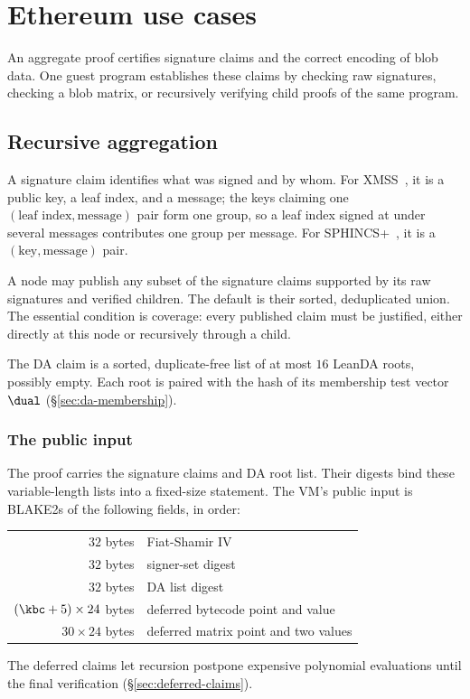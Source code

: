 \section{Ethereum use cases}\label{sec:ethereum}

An aggregate proof certifies signature claims and the correct encoding of blob data. One guest program establishes these claims by checking raw signatures, checking a blob matrix, or recursively verifying child proofs of the same program.

\subsection{Recursive aggregation}\label{sec:recursion}\label{sec:xmss-agg}\label{sec:sphincs-agg}

A signature claim identifies what was signed and by whom. For XMSS~\cite{rfc8391}, it is a public key, a leaf index, and a message; the keys claiming one $(\text{leaf index},\text{message})$ pair form one group, so a leaf index signed at under several messages contributes one group per message. For SPHINCS+~\cite{sphincs}, it is a $(\text{key},\text{message})$ pair.

A node may publish any subset of the signature claims supported by its raw signatures and verified children. The default is their sorted, deduplicated union. The essential condition is coverage: every published claim must be justified, either directly at this node or recursively through a child.

The DA claim is a sorted, duplicate-free list of at most $16$ LeanDA roots, possibly empty. Each root is paired with the hash of its membership test vector $\dual$ (\S\ref{sec:da-membership}). 

\subsubsection{The public input}\label{sec:rec-stmt}

The proof carries the signature claims and DA root list. Their digests bind these variable-length lists into a fixed-size statement. The VM's public input is BLAKE2s of the following fields, in order:
\begin{center}
\begin{tabular}{@{}rl@{}}
\hline
$32$ bytes & Fiat-Shamir IV\\
$32$ bytes & signer-set digest\\
$32$ bytes & DA list digest\\
$(\kbc+5)\times24$ bytes & deferred bytecode point and value\\
$30\times24$ bytes & deferred matrix point and two values\\
\hline
\end{tabular}
\end{center}
The deferred claims let recursion postpone expensive polynomial evaluations until the final verification (\S\ref{sec:deferred-claims}).

